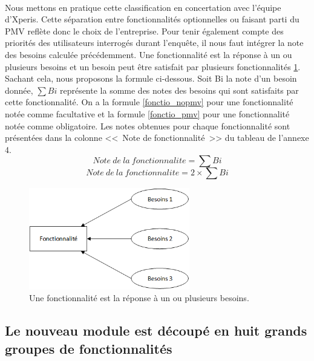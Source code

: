 			\paragraph{}%
			Nous mettons en pratique cette classification en concertation avec l'équipe
			d'Xperis. Cette séparation entre fonctionnalités optionnelles ou faisant
			parti du PMV reflète donc le choix de l'entreprise.
			Pour tenir également compte des priorités des utilisateurs interrogés durant
			l'enquête, il nous faut intégrer la note des besoins calculée précédemment.
			Une fonctionnalité est la réponse à un ou plusieurs besoins et un besoin peut
			être satisfait par plusieurs fonctionnalités \ref{mapping_besoins}. Sachant
			cela, nous proposons la formule ci-dessous.
			Soit Bi la note d'un besoin donnée, \begin{math}\sum Bi\end{math} représente
			la somme des notes des besoins qui sont satisfaits par cette fonctionnalité.
			On a la formule \ref{fonctio_nopmv} pour une fonctionnalité notée comme
			facultative et la formule \ref{fonctio_pmv} pour une fonctionnalité notée
			comme obligatoire. Les notes obtenues pour chaque fonctionnalité sont
			présentées dans la colonne <<~Note de fonctionnalité~>> du tableau de
			l'annexe 4.
			\begin{equation}
				\label{fonctio_nopmv}
				Note\ de\ la\ fonctionnalite=\sum Bi
			\end{equation}
			\begin{equation}
				\label{fonctio_pmv}
				Note\ de\ la\ fonctionnalite=2\times \sum Bi
			\end{equation}
			\begin{figure}[H]
				\centering
				\includegraphics[width=7cm]{../img/part2/mapping_besoins.png}
				\caption{\label{mapping_besoins} Une fonctionnalité est la réponse à un ou
				plusieurs besoins.}
			\end{figure}
			
		\subsection{Le nouveau module est découpé en huit grands groupes de
		fonctionnalités}
